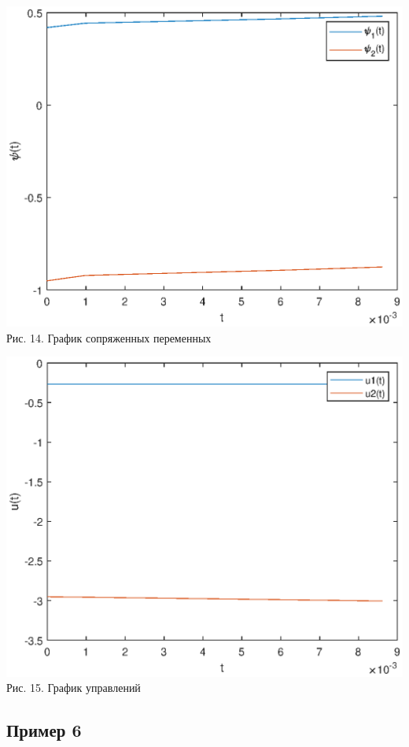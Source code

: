 \documentclass{article}
\theoremstyle{definition}
\begin{document}
\begin{center}
{\includegraphics[width=15cm]{pexample5.eps}}
{Рис. 14. График сопряженных переменных}
\end{center}

\begin{center}
{\includegraphics[width=15cm]{uexample5.eps}}
{Рис. 15. График управлений}
\end{center}

\newpage

\subsection{Пример 6}
\end{document}
